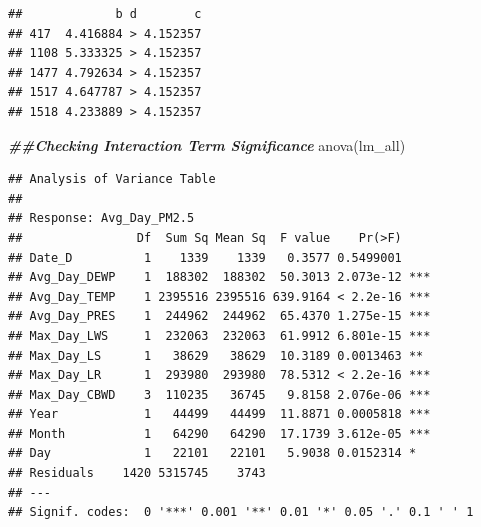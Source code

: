 \documentclass[
]{article}
\newenvironment{Shaded}{\begin{snugshade}}{\end{snugshade}}
\newcommand{\DocumentationTok}[1]{\textcolor[rgb]{0.56,0.35,0.01}{\textbf{\textit{#1}}}}
\newcommand{\FunctionTok}[1]{\textcolor[rgb]{0.00,0.00,0.00}{#1}}
\newcommand{\NormalTok}[1]{#1}
\begin{document}
\begin{verbatim}
##             b d        c
## 417  4.416884 > 4.152357
## 1108 5.333325 > 4.152357
## 1477 4.792634 > 4.152357
## 1517 4.647787 > 4.152357
## 1518 4.233889 > 4.152357
\end{verbatim}

\begin{Shaded}
\begin{Highlighting}[]
\DocumentationTok{\#\#Checking Interaction Term Significance}
\FunctionTok{anova}\NormalTok{(lm\_all)}
\end{Highlighting}
\end{Shaded}

\begin{verbatim}
## Analysis of Variance Table
## 
## Response: Avg_Day_PM2.5
##                Df  Sum Sq Mean Sq  F value    Pr(>F)    
## Date_D          1    1339    1339   0.3577 0.5499001    
## Avg_Day_DEWP    1  188302  188302  50.3013 2.073e-12 ***
## Avg_Day_TEMP    1 2395516 2395516 639.9164 < 2.2e-16 ***
## Avg_Day_PRES    1  244962  244962  65.4370 1.275e-15 ***
## Max_Day_LWS     1  232063  232063  61.9912 6.801e-15 ***
## Max_Day_LS      1   38629   38629  10.3189 0.0013463 ** 
## Max_Day_LR      1  293980  293980  78.5312 < 2.2e-16 ***
## Max_Day_CBWD    3  110235   36745   9.8158 2.076e-06 ***
## Year            1   44499   44499  11.8871 0.0005818 ***
## Month           1   64290   64290  17.1739 3.612e-05 ***
## Day             1   22101   22101   5.9038 0.0152314 *  
## Residuals    1420 5315745    3743                       
## ---
## Signif. codes:  0 '***' 0.001 '**' 0.01 '*' 0.05 '.' 0.1 ' ' 1
\end{verbatim}
\end{document}
